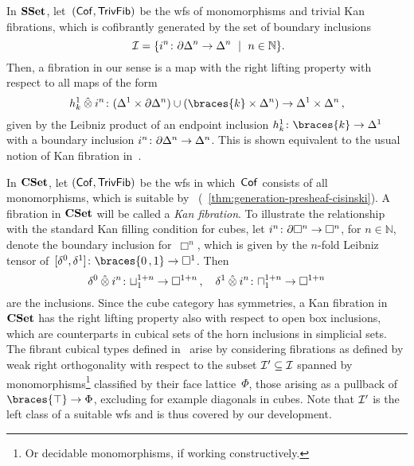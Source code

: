 \documentclass[reqno,10pt,a4paper,oneside,draft]{amsart}
\begin{document}
\begin{example} \label{thm:fib-is-kan}
In $\SSet$, let~$(\Cof, \TrivFib)$ be the wfs of monomorphisms and trivial Kan fibrations, which is cofibrantly generated by the set of boundary inclusions 
\[
\cal{I} = \{  i^n \co \partial \Delta^n \to \Delta^n \ \mid \ n \in \mathbb{N} \} \rlap{.}
\]
Then, a fibration in our sense is a map with the right lifting property with respect to all maps of the form
\[
h_k^1 \hatotimes i^n \co (\Delta^1 \times \partial \Delta^n ) \cup (\braces{k} \times \Delta^n ) \to \Delta^1 \times \Delta^n 
\, ,\]
given by the Leibniz product of an endpoint inclusion $h_k^1 \co \braces{k} \to \Delta^1$ with a 
boundary inclusion $i^n \co \partial \Delta^n \to \Delta^n$.
This is shown equivalent to the usual notion of Kan fibration in~\cite[Chap.~IV, Sec.~2]{gabriel-zisman:calculus-of-fractions}.
\end{example}

\begin{example} \label{nonalgebraic-cof}
In $\CSet$, let $(\Cof, \TrivFib)$ be the wfs in which~$\Cof$ consists of all monomorphisms, which is
suitable by~\cite[Proposition~1.2.27]{cisinski-asterisque} (\cf~\cref{thm:generation-presheaf-cisinski}). 
A fibration in $\CSet$ will be called a \emph{Kan fibration}.
To illustrate the relationship with the standard Kan filling condition for cubes, let $i^n \co \partial \Box^n \to \Box^n$, for $n \in \mathbb{N}$, denote the boundary inclusion for~$\Box^n$, which is given by the $n$-fold Leibniz tensor of~$[\lcyl, \rcyl] \co \braces{0\,, 1} \to \Box^1$.
Then 
\[
\lcyl \hatotimes i^n \co \sqcup_1^{1+n} \to \Box^{1+n} \, , \quad  \rcyl \hatotimes i^n \co \sqcap_1^{1+n} \to \Box^{1+n}
\]
are the inclusions. 
Since the cube category has symmetries, a Kan fibration in $\CSet$ has the right lifting property also with respect to open box inclusions, which are counterparts in cubical sets of the horn inclusions in simplicial sets.
The fibrant cubical types defined in~\cite{cohen-et-al:cubicaltt} arise by considering fibrations as defined by weak right 
orthogonality with respect to  the subset $\cal{I}' \subseteq \cal{I}$  spanned by monomorphisms\footnote{Or decidable monomorphisms, if working constructively.} classified by their face lattice~$\Phi$, \ie those arising as a pullback 
of~$\braces{\top} \to \Phi$, excluding for example diagonals in cubes.
Note that $\cal{I}'$ is the left class of a suitable wfs and is thus covered by our development.
\end{example}
\end{document}
